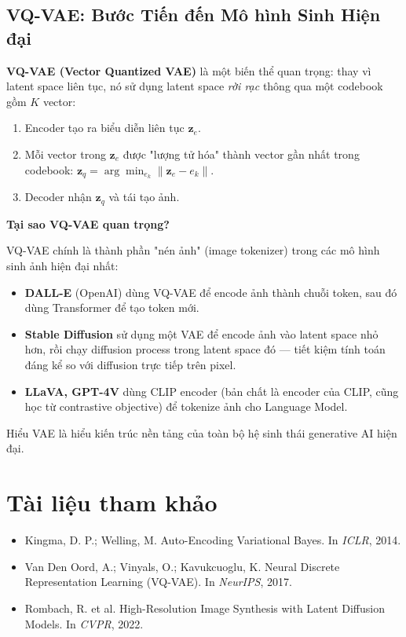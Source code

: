 \subsection{VQ-VAE: Bước Tiến đến Mô hình Sinh Hiện đại}
\label{subsec:vqvae}

\textbf{VQ-VAE (Vector Quantized VAE)} \cite{VanDenOord2017} là một biến thể quan trọng: thay vì latent space liên tục, nó sử dụng latent space \textit{rời rạc} thông qua một codebook gồm $K$ vector:

\begin{enumerate}
    \item Encoder tạo ra biểu diễn liên tục $\mathbf{z}_e$.
    \item Mỗi vector trong $\mathbf{z}_e$ được "lượng tử hóa" thành vector gần nhất trong codebook: $\mathbf{z}_q = \arg\min_{e_k} \|\mathbf{z}_e - e_k\|$.
    \item Decoder nhận $\mathbf{z}_q$ và tái tạo ảnh.
\end{enumerate}

\begin{mdframed}[style=infobox]
    \textbf{Tại sao VQ-VAE quan trọng?}

    VQ-VAE chính là thành phần "nén ảnh" (image tokenizer) trong các mô hình sinh ảnh hiện đại nhất:
    \begin{itemize}
        \item \textbf{DALL-E} (OpenAI) dùng VQ-VAE để encode ảnh thành chuỗi token, sau đó dùng Transformer để tạo token mới.
        \item \textbf{Stable Diffusion} sử dụng một VAE để encode ảnh vào latent space nhỏ hơn, rồi chạy diffusion process trong latent space đó — tiết kiệm tính toán đáng kể so với diffusion trực tiếp trên pixel.
        \item \textbf{LLaVA, GPT-4V} dùng CLIP encoder (bản chất là encoder của CLIP, cũng học từ contrastive objective) để tokenize ảnh cho Language Model.
    \end{itemize}
    Hiểu VAE là hiểu kiến trúc nền tảng của toàn bộ hệ sinh thái generative AI hiện đại.
\end{mdframed}

\section*{Tài liệu tham khảo}
\begin{itemize}
    \item[1] Kingma, D. P.; Welling, M. Auto-Encoding Variational Bayes. In \textit{ICLR}, 2014.
    \item[2] Van Den Oord, A.; Vinyals, O.; Kavukcuoglu, K. Neural Discrete Representation Learning (VQ-VAE). In \textit{NeurIPS}, 2017.
    \item[3] Rombach, R. et al. High-Resolution Image Synthesis with Latent Diffusion Models. In \textit{CVPR}, 2022.
\end{itemize}
